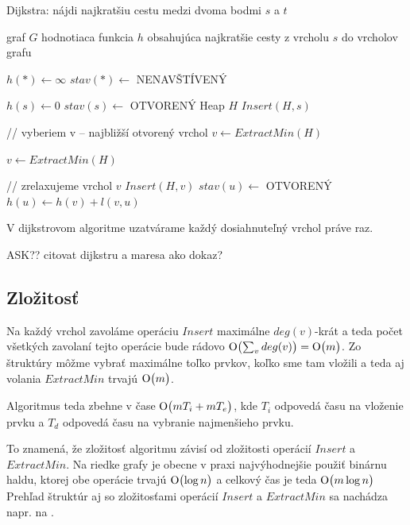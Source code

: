 \begin{algorithm}
\caption{Dijkstra: nájdi najkratšiu cestu medzi dvoma bodmi $s$ a $t$}
\label{alg:dijkstra}
\begin{algorithmic}[1] %
\REQUIRE graf $G$
\ENSURE hodnotiaca funkcia $h$ obsahujúca najkratšie cesty  z vrcholu $s$ do vrcholov grafu


\STATE $ h(*) \leftarrow \infty $
\STATE $ stav(*) \leftarrow$ NENAVŠTÍVENÝ

\STATE $h(s) \leftarrow 0$
\STATE $stav(s) \leftarrow $ OTVORENÝ
\STATE Heap $H$
\STATE $Insert(H, s)$

	
	\STATE // vyberiem v -- najbližší otvorený vrchol
	\STATE $v \leftarrow ExtractMin(H)$
	
		\STATE $v \leftarrow ExtractMin(H)$
	\ENDWHILE
	
	\STATE // zrelaxujeme vrchol $v$
			\STATE $Insert(H, v)$
			\STATE $stav(u) \leftarrow$ OTVORENÝ
			\STATE $h(u) \leftarrow h(v) + l(v, u)$
			
		\ENDIF
	\ENDFOR
\ENDWHILE

\end{algorithmic}
\end{algorithm}

\begin{theorem}
V dijkstrovom algoritme uzatvárame každý dosiahnuteľný vrchol práve raz.
\end{theorem}
ASK?? citovat dijkstru a maresa ako dokaz? 

\subsection{Zložitosť}
Na každý vrchol zavoláme operáciu $Insert$ maximálne $deg(v)$-krát a teda počet všetkých zavolaní tejto operácie bude rádovo $\operatorname{O}\bigl(\sum_{v}{deg(v)}\bigr) = \operatorname{O}\bigl(m\bigr)$.
Zo štruktúry môžme vybrať maximálne toľko prvkov, koľko sme tam vložili a teda aj volania $ExtractMin$ trvajú $\operatorname{O}\bigl(m\bigr)$.

Algoritmus teda zbehne v čase $\operatorname{O}\bigl(m T_i + m T_e\bigr)$, kde $T_i$ odpovedá času na vloženie prvku a $T_d$ odpovedá času na vybranie najmenšieho prvku.

To znamená, že zložitosť algoritmu závisí od zložitosti operácií $Insert$ a $ExtractMin$. Na riedke grafy je obecne v praxi najvýhodnejšie použiť 
binárnu haldu, ktorej obe operácie trvajú $\operatorname{O}\bigl(\log{n} \bigr) $ a celkový čas je teda $\operatorname{O}\bigl(m\log{n}\bigr)$
Prehľad štruktúr aj so zložitosťami operácií $Insert$ a $ExtractMin$ sa nachádza napr. na \cite{mares07}.

